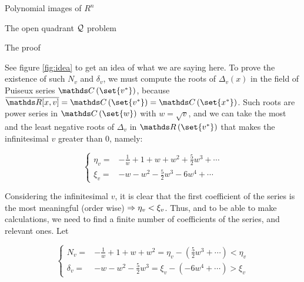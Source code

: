 \documentclass[11pt, a4paper, english, twoside, notitlepage]{report}
\begin{document}
\begin{chapter}{Polynomial images of $R^n$}
\begin{section}{The open quadrant $\mathcal{Q}$ problem}
\begin{subsection}{The proof}
\begin{Proof}
			See figure \ref{fig:idea} to get an idea of what we are saying here. To prove the existence of such $N_v$ and $\delta_v$, we must compute the roots of $\Delta_v(x)$ in the field of Puiseux series %
			$\C\left(\set{v^*}\right)$, because $\overline{\R[x, v]} = \C\left(\set{v^*}\right) = \C\left(\set{x^*}\right)$. %
			Such roots are power series in $\C\left(\set{w}\right)$ with $w = \sqrt{v}$, and we can take the most and the least negative roots of $\Delta_v$ in $\R\left(\set{v^*}\right)$ that makes the infinitesimal $v$ greater than 0, namely:
			
			\begin{equation*}\left\{
				\begin{split}
					\eta_v=&-\frac{1}{w}+1+w+w^2+\frac{5}{2}w^3+\cdots\\
					\xi_v=&-w-w^2-\frac{5}{2}w^3-6w^4+\cdots
				\end{split}\right.
			\end{equation*}
			
			Considering the infinitesimal $v$, it is clear that the first coefficient of the series is the most meaningful (order wise) $\Rightarrow \eta_v < \xi_v$. Thus, and to be able to make calculations, we need to find a finite number of coefficients of the series, and relevant ones. Let
			
			\begin{equation*}\left\{
				\begin{split}
					N_v=&-\frac{1}{w}+1+w+w^2=\eta_v-(\frac{5}{2}w^3+\cdots)<\eta_v\\
					\delta_v=&-w-w^2-\frac{5}{2}w^3=\xi_v-(-6w^4+\cdots)>\xi_v
				\end{split}\right.
			\end{equation*}
			

\end{Proof}
\end{subsection}
\end{section}
\end{chapter}
\end{document}

